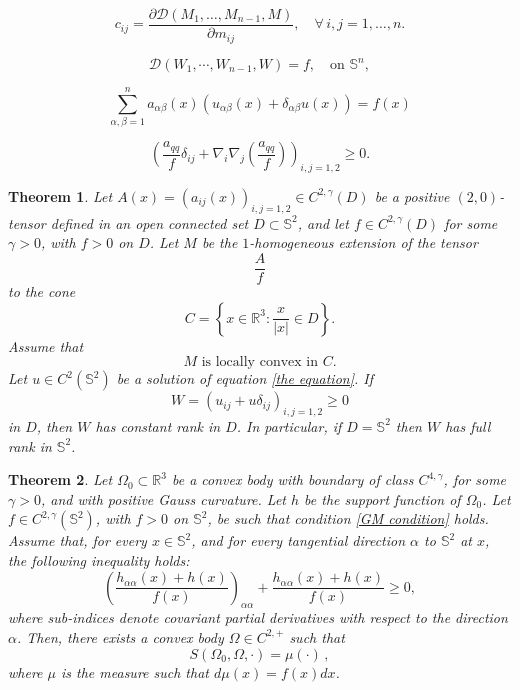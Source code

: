 \documentclass[10pt,a4paper]{amsart}
\newtheorem{thm}{Theorem}
\newcommand{\R}{\mathbb R}
\newcommand{\s}{\mathbb S}
\begin{document}
\begin{equation}\label{cmc}
c_{ij}=\frac{\partial \mathscr{D}(M_1,\dots,M_{n-1},M)}{\partial m_{ij}},\quad\forall\, i,j=1,\dots,n.
\end{equation}

\begin{equation}\label{Prob-C}
\mathscr{D}(W_1,\cdots, W_{n-1}, W)=f, \quad \mbox{on $\s^n$},
\end{equation}

\begin{equation}\label{the equation}
\sum_{\alpha,\beta=1}^n a_{\alpha\beta}(x)(u_{\alpha\beta}(x)+\delta_{\alpha\beta}u(x))=f(x)
\end{equation}

\begin{equation}\label{cond-1 2} 
\left(\frac{a_{qq}}f\delta_{ij}+ \nabla_i\nabla_j\left(\frac{a_{qq}}{f}\right)\right)_{i,j=1,2}\ge 0.
\end{equation}

\begin{thm}\label{main theorem n=2 rephrased} Let $A(x)=(a_{ij}(x))_{i,j=1,2}\in C^{2,\gamma}(D)$ be a positive $(2,0)$-tensor defined in an open connected set $D\subset\s^2$, and let $f\in C^{2, \gamma}(D)$ for some $\gamma>0$, with $f>0$ on $D$. Let $M$ be the $1$-homogeneous extension of the tensor
$$
\frac{A}{f}
$$
to the cone 
$$
C=\left\{x\in\R^3\colon\frac{x}{|x|}\in D\right\}.
$$
Assume that  
\begin{equation}\label{the condition}
M\mbox{ is locally convex in $C$}.
\end{equation}
Let $u\in C^2(\s^2)$ be a solution of equation \eqref{the equation}. If  
\[
W=(u_{ij}+u\delta_{ij})_{i,j=1,2}\ge 0
\] 
in $D$, then $W$ has constant rank in $D$. In particular, if $D=\s^2$ then $W$ has full rank in $\s^2$. 
\end{thm}

\begin{thm}\label{MC 3dim 1} Let $\Omega_0\subset\R^3$ be a convex body with boundary of class $C^{4,\gamma}$, for some $\gamma>0$, and with positive Gauss curvature. Let $h$ be the support function of $\Omega_0$. Let $f\in C^{2,\gamma}(\s^2)$, with $f>0$ on $\s^2$, be such that condition \eqref{GM condition} holds. Assume that, for every $x\in\s^2$, and for every tangential direction $\alpha$ to $\s^2$ at $x$, the following inequality holds: 
\begin{equation}\label{new form dim two statement}
\left(\frac{h_{\alpha\alpha}(x)+h(x)}{f(x)}\right)_{\alpha\alpha}+\frac{h_{\alpha\alpha}(x)+h(x)}{f(x)}\ge0,
\end{equation}
where sub-indices denote covariant partial derivatives with respect to the direction $\alpha$. Then, there exists a convex body $\Omega\in C^{2,+}$ such that
$$
S(\Omega_0,\Omega,\cdot)=\mu(\cdot)\,,
$$
where $\mu$ is the measure such that $d\mu(x)=f(x)dx$.
\end{thm}
\end{document}
